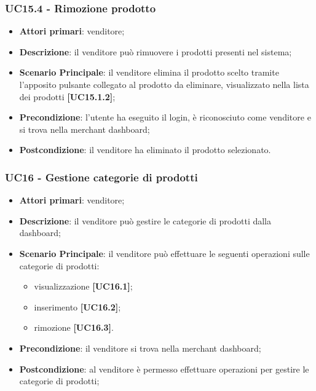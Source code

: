 \subsubsection{UC15.4 - Rimozione prodotto}
\begin{itemize}
\item \textbf{Attori primari}: venditore;
\item \textbf{Descrizione}: il venditore può rimuovere i prodotti presenti nel sistema;
\item \textbf{Scenario Principale}: il venditore elimina il prodotto scelto tramite l'apposito pulsante collegato al prodotto da eliminare, visualizzato nella lista dei prodotti \textbf{[UC15.1.2]};
\item \textbf{Precondizione}: l'utente ha eseguito il login, è riconosciuto come venditore e si trova nella merchant dashboard;
\item \textbf{Postcondizione}: il venditore ha eliminato il prodotto selezionato.
\end{itemize}

\subsubsection{UC16 - Gestione categorie di prodotti}
\begin{itemize}
\item \textbf{Attori primari}: venditore;
\item \textbf{Descrizione}: il venditore può gestire le categorie di prodotti dalla dashboard;
\item \textbf{Scenario Principale}: il venditore può effettuare le seguenti operazioni sulle categorie di prodotti:
\begin{itemize}
	\item visualizzazione \textbf{[UC16.1]};
	\item inserimento \textbf{[UC16.2]};
	\item rimozione \textbf{[UC16.3]}.
\end{itemize}
\item \textbf{Precondizione}: il venditore si trova nella merchant dashboard;
\item \textbf{Postcondizione}: al venditore è permesso effettuare operazioni per gestire le categorie di prodotti;
\end{itemize}

